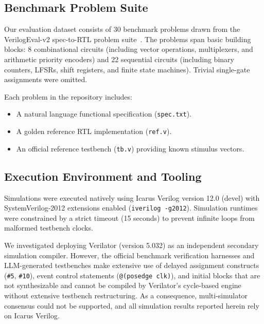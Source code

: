 \documentclass[conference]{IEEEtran}
\begin{document}
\subsection{Benchmark Problem Suite}
Our evaluation dataset consists of 30 benchmark problems drawn from the VerilogEval-v2 spec-to-RTL problem suite~\cite{liu2023verilogeval}. The problems span basic building blocks: 8 combinational circuits (including vector operations, multiplexers, and arithmetic priority encoders) and 22 sequential circuits (including binary counters, LFSRs, shift registers, and finite state machines). Trivial single-gate assignments were omitted. 

Each problem in the repository includes:
\begin{itemize}
    \item A natural language functional specification (\texttt{spec.txt}).
    \item A golden reference RTL implementation (\texttt{ref.v}).
    \item An official reference testbench (\texttt{tb.v}) providing known stimulus vectors.
\end{itemize}

\subsection{Execution Environment and Tooling}
Simulations were executed natively using Icarus Verilog version 12.0 (devel) with SystemVerilog-2012 extensions enabled (\texttt{iverilog -g2012}). Simulation runtimes were constrained by a strict timeout (15 seconds) to prevent infinite loops from malformed testbench clocks. 

We investigated deploying Verilator (version 5.032) as an independent secondary simulation compiler. However, the official benchmark verification harnesses and LLM-generated testbenches make extensive use of delayed assignment constructs (\texttt{\#5}, \texttt{\#10}), event control statements (\texttt{@(posedge clk)}), and initial blocks that are not synthesizable and cannot be compiled by Verilator's cycle-based engine without extensive testbench restructuring. As a consequence, multi-simulator consensus could not be supported, and all simulation results reported herein rely on Icarus Verilog.
\end{document}
